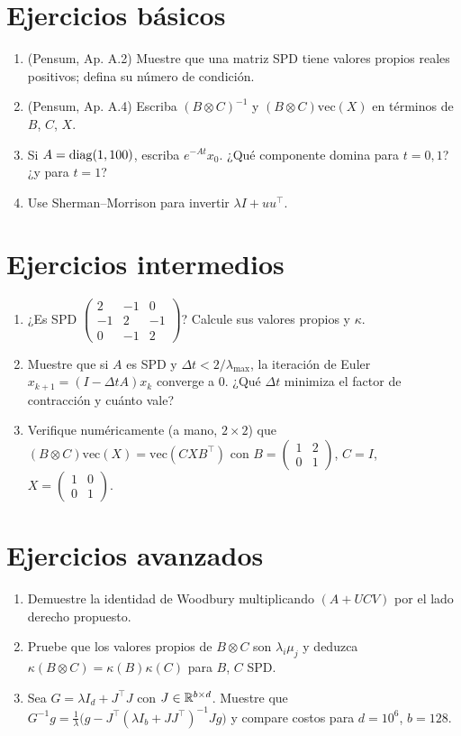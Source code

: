 \documentclass[11pt,a4paper]{article}
\begin{document}

\section{Ejercicios básicos}
\begin{enumerate}[label=\textbf{B\arabic*.}]
\item (Pensum, Ap. A.2) Muestre que una matriz SPD tiene valores propios reales positivos; defina su número de condición.
\item (Pensum, Ap. A.4) Escriba $(B\otimes C)^{-1}$ y $(B\otimes C)\mathrm{vec}(X)$ en términos de $B$, $C$, $X$.
\item Si $A=\operatorname{diag}(1,100)$, escriba $e^{-At}x_0$. ¿Qué componente domina para $t=0{,}1$? ¿y para $t=1$?
\item Use Sherman--Morrison para invertir $\lambda I+uu^\top$.
\end{enumerate}

\section{Ejercicios intermedios}
\begin{enumerate}[label=\textbf{I\arabic*.}]
\item ¿Es SPD $\begin{pmatrix}2&-1&0\\-1&2&-1\\0&-1&2\end{pmatrix}$? Calcule sus valores propios y $\kappa$.
\item Muestre que si $A$ es SPD y $\Delta t<2/\lambda_{\max}$, la iteración de Euler $x_{k+1}=(I-\Delta tA)x_k$ converge a 0. ¿Qué $\Delta t$ minimiza el factor de contracción y cuánto vale?
\item Verifique numéricamente (a mano, $2\times2$) que $(B\otimes C)\mathrm{vec}(X)=\mathrm{vec}(CXB^\top)$ con $B=\begin{pmatrix}1&2\\0&1\end{pmatrix}$, $C=I$, $X=\begin{pmatrix}1&0\\0&1\end{pmatrix}$.
\end{enumerate}

\section{Ejercicios avanzados}
\begin{enumerate}[label=\textbf{A\arabic*.}]
\item Demuestre la identidad de Woodbury multiplicando $(A+UCV)$ por el lado derecho propuesto.
\item Pruebe que los valores propios de $B\otimes C$ son $\lambda_i\mu_j$ y deduzca $\kappa(B\otimes C)=\kappa(B)\kappa(C)$ para $B$, $C$ SPD.
\item Sea $G=\lambda I_d+J^\top J$ con $J\in\mathbb{R}^{b\times d}$. Muestre que $G^{-1}g=\frac1\lambda\big(g-J^\top(\lambda I_b+JJ^\top)^{-1}Jg\big)$ y compare costos para $d=10^6$, $b=128$.
\end{enumerate}
\end{document}
